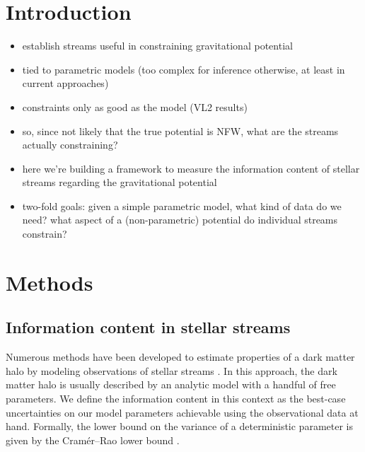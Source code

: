 \documentclass[modern]{aastex61}
\newcommand{\acronym}[1]{{\small{#1}}}
\newcommand{\CRLB}{\acronym{CRLB}}
\begin{document}

\section{Introduction} \label{sec:intro}

\begin{itemize}
 \item establish streams useful in constraining gravitational potential
 \item tied to parametric models (too complex for inference otherwise, at least in current approaches)
 \item constraints only as good as the model (VL2 results)
 \item so, since not likely that the true potential is NFW, what are the streams actually constraining? 
 \item here we're building a framework to measure the information content of stellar streams regarding the gravitational potential
 \item two-fold goals: given a simple parametric model, what kind of data do we need? what aspect of a (non-parametric) potential do individual streams constrain?
\end{itemize}


\section{Methods}
\label{sec:method}

\subsection{Information content in stellar streams}
Numerous methods have been developed to estimate properties of a dark matter halo by modeling observations of stellar streams \citep[e.g.,][]{}.
In this approach, the dark matter halo is usually described by an analytic model with a handful of free parameters.
We define the information content in this context as the best-case uncertainties on our model parameters achievable using the observational data at hand.
Formally, the lower bound on the variance of a deterministic parameter is given by the Cram\' er--Rao lower bound \citep[\CRLB,][]{Cramer1946, Rao1945}.
\end{document}
